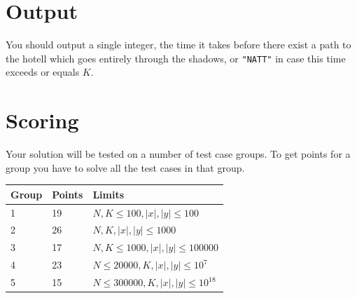 \section*{Output}
You should output a single integer, the time it takes before there exist a path to the hotell which goes entirely through the shadows, or \texttt{"NATT"} in case this time exceeds or equals $K$.

\section*{Scoring}
Your solution will be tested on a number of test case groups. To get points for a group
you have to solve all the test cases in that group.

\begin{tabular}{| l | l | l |}
	\hline
	Group & Points & Limits\\ \hline
	1 & 19 & $N, K \le 100, |x|, |y| \le 100$ \\ \hline
	2 & 26 & $N, K, |x|, |y| \le 1000$ \\ \hline
	3 & 17 & $N, K \le 1000, |x|, |y| \le 100000$ \\ \hline
	4 & 23 & $N \le 20000, K, |x|, |y| \le 10^7$ \\ \hline
	5 & 15 & $N \le 300000, K, |x|, |y| \le 10^{18}$ \\ \hline
\end{tabular}

